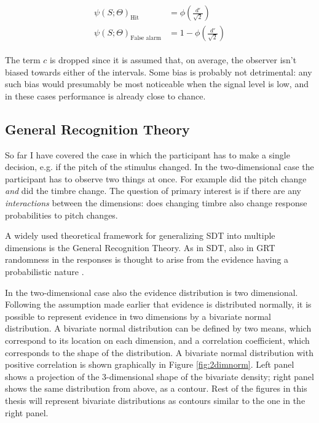 \documentclass{article}\usepackage{knitr}
\begin{document}
\begin{align*}
\begin{split}
\psi(S; \Theta)_{\text{Hit}} &= \phi(\frac{d'}{\sqrt{2}}) \\
\psi(S; \Theta)_{\text{False alarm}} &=  1 - \phi(\frac{d'}{\sqrt{2}})
\end{split}
\end{align*}

The term $c$ is dropped since it is assumed that, on average, the observer isn't biased towards either of the intervals. Some bias is probably not detrimental: any such bias would presumably be most noticeable when the signal level is low, and in these cases performance is already close to chance. 



\subsection{General Recognition Theory}
\label{sec:grt_mdls}

So far I have covered the case in which the participant has to make a single decision, e.g. if the pitch of the stimulus changed. In the two-dimensional case the participant has to observe two things at once. For example did the pitch change \textit{and} did the timbre change. The question of primary interest is if there are any \textit{interactions} between the dimensions: does changing timbre also change response probabilities to pitch changes.

A widely used theoretical framework for generalizing SDT into multiple dimensions is the General Recognition Theory. As in SDT, also in GRT randomness in the responses is thought to arise from the evidence having a probabilistic nature \citep{ashby1986, ashby2015, kadlec1992}. 

In the two-dimensional case also the evidence distribution is two dimensional. Following the assumption made earlier that evidence is distributed normally, it is possible to represent evidence in two dimensions by a bivariate normal distribution. A bivariate normal distribution can be defined by two means, which correspond to its location on each dimension, and a correlation coefficient, which corresponds to the shape of the distribution. A bivariate normal distribution with positive correlation is shown graphically in Figure \ref{fig:2dimnorm}. Left panel shows a projection of the 3-dimensional shape of the bivariate density; right panel shows the same distribution from above, as a contour. Rest of the figures in this thesis will represent bivariate distributions as contours similar to the one in the right panel.
\end{document}
